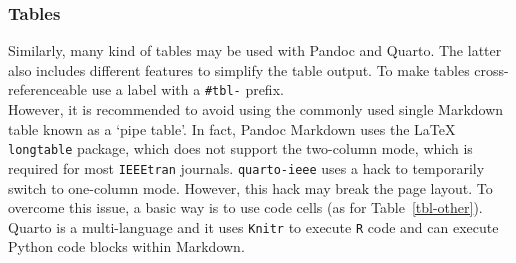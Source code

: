\documentclass[
  twoside,
  web,
            journal,
    ]{ieeecolor}
\theoremstyle{plain}
\theoremstyle{remark}
\begin{document}
\subsubsection{Tables}\label{sec-tables}

Similarly, many kind of tables may be used with Pandoc and Quarto. The
latter also includes different features to simplify the table output. To
make tables cross-referenceable use a label with a \texttt{\#tbl-}
prefix.\\
However, it is recommended to avoid using the commonly used single
Markdown table known as a `pipe table'. In fact, Pandoc Markdown uses
the {\LaTeX} \texttt{longtable} package, which does not support the
two-column mode, which is required for most \texttt{IEEEtran} journals.
\texttt{quarto-ieee} uses a hack to temporarily switch to one-column
mode. However, this hack may break the page layout. To overcome this
issue, a basic way is to use code cells (as for Table~\ref{tbl-other}).
Quarto is a multi-language and it uses \texttt{Knitr} to execute
\texttt{R} code and can execute Python code blocks within Markdown.

\begin{table}

\caption{\label{tbl-panel}Main Caption}

\begin{minipage}[t]{0.50\linewidth}



\end{minipage}%
%
\begin{minipage}[t]{0.50\linewidth}



\end{minipage}%

\end{table}%
\end{document}
